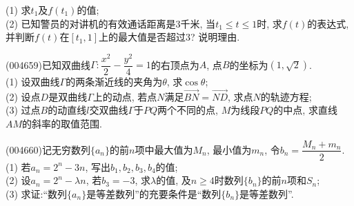 (1) 求$t_1$及$f(t_1)$的值;\\
(2) 已知警员的对讲机的有效通话距离是$3$千米, 当$t_1\le t\le 1$时, 求$f(t)$的表达式, 并判断$f(t)$在$[t_1,1]$上的最大值是否超过$3$? 说明理由.
\item (004659)已知双曲线$\Gamma:\dfrac{x^2}2-\dfrac{y^2}4=1$的右顶点为$A$, 点$B$的坐标为$(1,\sqrt 2)$.\\
(1) 设双曲线$\Gamma$的两条渐近线的夹角为$\theta$, 求$\cos\theta$;\\
(2) 设点$D$是双曲线$\Gamma$上的动点, 若点$N$满足$\overrightarrow{BN}=\overrightarrow{ND}$, 求点$N$的轨迹方程;\\
(3) 过点$B$的动直线$l$交双曲线$\Gamma$于$PQ$两个不同的点, $M$为线段$PQ$的中点, 求直线$AM$的斜率的取值范围.
\item (004660)记无穷数列$\{a_n\}$的前$n$项中最大值为$M_n$, 最小值为$m_n$, 令$b_n=\dfrac{M_n+m_n}{2}$.\\
(1) 若$a_n=2^n-3n$, 写出$b_1,b_2,b_3,b_4$的值;\\
(2) 设$a_n=2^n-\lambda n$, 若$b_3=-3$, 求$\lambda$的值, 及$n\ge 4$时数列$\{b_n\}$的前$n$项和$S_n$;\\
(3) 求证:``数列$\{a_n\}$是等差数列''的充要条件是``数列$\{b_n\}$是等差数列''.
